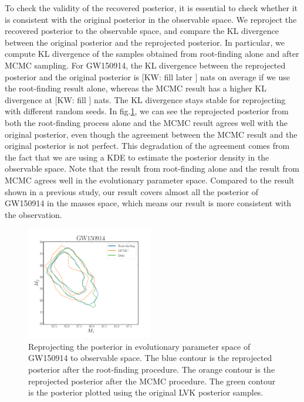 \documentclass[twocolumn]{aastex631}
\newcommand{\kw}[1]{{\color{rb4}[KW: #1 ]}}
\begin{document}
To check the validity of the recovered posterior, it is essential to check whether it is consistent with the original posterior in the observable space.
We reproject the recovered posterior to the observable space, and compare the KL divergence between the original posterior and the reprojected posterior.
In particular, we compute KL divergence of the samples obtained from root-finding alone and after MCMC sampling.
For GW150914, the KL divergence between the reprojected posterior and the original posterior is \kw{fill later} nats on average if we use the root-finding result alone,
whereas the MCMC result has a higher KL divergence at \kw{fill} nats.
The KL divergence stays stable for reprojecting with different random seeds. 
In fig.\ref{fig:GW150914_reprojection}, we can see the reprojected posterior from both the root-finding process alone and the MCMC result agrees well with the original posterior,
even though the agreement between the MCMC result and the original posterior is not perfect. 
This degradation of the agreement comes from the fact that we are using a KDE to estimate the posterior density in the observable space.
Note that the result from root-finding alone and the result from MCMC agrees well in the evolutionary parameter space.
Compared to the result shown in a previous study, our result covers almost all the posterior of GW150914 in the masses space,
which means our result is more consistent with the observation.


\begin{figure}
\includegraphics[width=0.49\textwidth]{static/GW150914_reprojection.pdf}
\caption{Reprojecting the posterior in evolutionary parameter space of GW150914 to observable space.
The blue contour is the reprojected posterior after the root-finding procedure.
The orange contour is the reprojected posterior after the MCMC procedure.
The green contour is the posterior plotted using the original LVK posterior samples.
}
\label{fig:GW150914_reprojection}
\end{figure}
\end{document}
